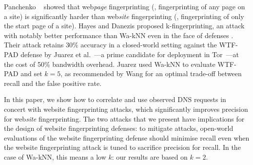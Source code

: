 Panchenko \ea~\cite{Panchenko2016a} showed that web\emph{page}
fingerprinting (\ie, fingerprinting of any page on a site) is
significantly harder than web\emph{site} fingerprinting (\ie,
fingerprinting of only the start page of a site).  Hayes and Danezis
proposed k-fingerprinting, an attack with notably better performance
than Wa-kNN even in the face of defenses
\cite{kfingerprinting}. Their attack retains 30\% accuracy in a
closed-world setting against the WTF-PAD defense by Juarez et
al.~\cite{DBLP:journals/corr/JuarezIPDW15}---a prime candidate for
deployment in Tor~\cite{adapativepadding}---at the cost of 50\% bandwidth
overhead. Juarez \ea used Wa-kNN to evaluate WTF-PAD and set $k=5$, as
recommended by Wang \ea for an optimal trade-off between recall and the
false positive rate.

In this paper, we show how to correlate and use observed DNS requests in
concert with website fingerprinting attacks,
which significantly
improves precision for web\emph{site} fingerprinting.
The two \name attacks that we present have implications
for the design of website fingerprinting defenses:
to mitigate \name attacks, open-world evaluations of the website fingerprinting
defense should minimise recall even when the website fingerprinting attack is
tuned to sacrifice precision for recall.  In the case of Wa-kNN, this means
a low $k$: our results are based on $k=2$.
